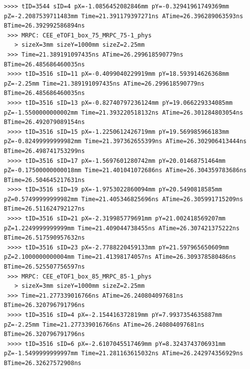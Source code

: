 \documentclass[bachelor,openany,oneside,color]{buaathesis}
\begin{document}
\begin{lstlisting}[caption={eTOF1:MRPC},label={data:MRPC},firstnumber=4397,lastline=4453]
 >>>> tID=3544 sID=4 pX=-1.0856452082846mm pY=-0.32941961749369mm pZ=-2.2087539711483mm Time=21.391179397271ns ATime=26.396289063593ns BTime=26.392992586894ns
 >>> MRPC: CEE_eTOF1_box_75_MRPC_75-1_phys
   > sizeX=3mm sizeY=1000mm sizeZ=2.25mm 
 >>> Time=21.389191097435ns ATime=26.299618590779ns BTime=26.485686460035ns
 >>>> tID=3516 sID=11 pX=-0.4099040229919mm pY=18.593914626368mm pZ=-2.25mm Time=21.389191097435ns ATime=26.299618590779ns BTime=26.485686460035ns
 >>>> tID=3516 sID=13 pX=-0.82740797236124mm pY=19.066229334085mm pZ=-1.5500000000002mm Time=21.393220518132ns ATime=26.301284803054ns BTime=26.492079089154ns
 >>>> tID=3516 sID=15 pX=-1.2250612426719mm pY=19.569985966183mm pZ=-0.82499999999982mm Time=21.397362655399ns ATime=26.302906413444ns BTime=26.498741753299ns
 >>>> tID=3516 sID=17 pX=-1.5697601280742mm pY=20.01468751464mm pZ=-0.17500000000018mm Time=21.401041072686ns ATime=26.304359783686ns BTime=26.504645217631ns
 >>>> tID=3516 sID=19 pX=-1.9753022860094mm pY=20.5490818585mm pZ=0.57499999999982mm Time=21.405346825696ns ATime=26.305991715209ns BTime=26.511624792127ns
 >>>> tID=3516 sID=21 pX=-2.319985779691mm pY=21.002418569207mm pZ=1.2249999999999mm Time=21.409044738455ns ATime=26.307421375222ns BTime=26.517590957632ns
 >>>> tID=3516 sID=23 pX=-2.7788220459133mm pY=21.597965650609mm pZ=2.1000000000004mm Time=21.41398174057ns ATime=26.309378580486ns BTime=26.525507756597ns
 >>> MRPC: CEE_eTOF1_box_85_MRPC_85-1_phys
   > sizeX=3mm sizeY=1000mm sizeZ=2.25mm 
 >>> Time=21.277339016766ns ATime=26.240804097681ns BTime=26.320796791796ns
 >>>> tID=3516 sID=4 pX=-2.154416372819mm pY=7.9937354635887mm pZ=-2.25mm Time=21.277339016766ns ATime=26.240804097681ns BTime=26.320796791796ns
 >>>> tID=3516 sID=6 pX=-2.6107045517469mm pY=8.3243743706931mm pZ=-1.5499999999997mm Time=21.281163615032ns ATime=26.242974356929ns BTime=26.32627572908ns
\end{lstlisting}

%
%
\end{document}
